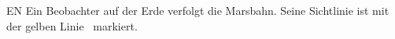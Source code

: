 \documentclass{article}
\begin{document}
\thispagestyle{empty}
\sffamily
\LARGE
\pagecolor{black}
\color{white}
\noindent
EN Ein Beobachter auf der Erde verfolgt die Marsbahn. Seine
Sichtlinie ist mit der \color{yellow}gelben Linie\color{white} ~markiert.
\end{document}
